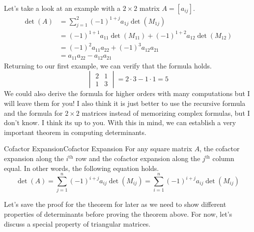 \documentclass[../main.tex]{subfiles}
\begin{document}
Let's take a look at an example with a $2 \times 2$ matrix
$A = [a_{ij}]$.
\begin{align*}
    \det(A)
    &= \sum_{j=1}^2 (-1)^{1 + j} a_{1j} \det(M_{1j}) \\
    &= (-1)^{1 + 1} a_{11} \det(M_{11}) +
        (-1)^{1 + 2} a_{12} \det(M_{12}) \\
    &= (-1)^{2} a_{11} a_{22} + (-1)^{3} a_{12} a_{21} \\
    &= a_{11} a_{22} - a_{12} a_{21}
\end{align*}
Returning to our first example, we can verify that the formula holds.
\[
\begin{vmatrix}
    2 & 1 \\
    1 & 3
\end{vmatrix}
= 2 \cdot 3 - 1 \cdot 1
= 5
\]
We could also derive the formula for higher orders with many
computations but I will leave them for you! I also think it is
just better to use the recursive formula and the formula for
$2 \times 2$ matrices instead of memorizing complex formulas,
but I don't know. I think its up to you. With this in mind,
we can establish a very important theorem in computing determinants.

\begin{theorem}{Cofactor Expansion}{Cofactor Expansion}
For any square matrix $A$, the cofactor expansion along the
$i^\text{th}$ row and the cofactor expansion along the $j^\text{th}$
column equal. In other words, the following equation holds.
\[
\det(A)
= \sum_{j=1}^n (-1)^{i + j} a_{ij} \det(M_{ij})
= \sum_{i=1}^n (-1)^{i + j} a_{ij} \det(M_{ij})
\]
\end{theorem}

Let's save the proof for the theorem for later as we need to show
different properties of determinants before proving the theorem
above. For now, let's discuss a special property of triangular
matrices.
\end{document}
